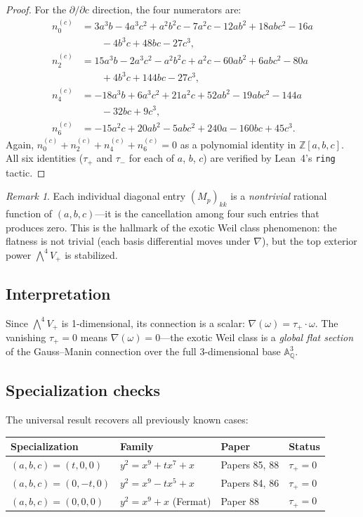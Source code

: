 \documentclass[11pt,a4paper]{article}
\theoremstyle{definition}
\theoremstyle{remark}
\newtheorem{remark}[theorem]{Remark}
\newcommand{\ZZ}{\mathbb{Z}}
\newcommand{\QQ}{\mathbb{Q}}
\newcommand{\Aff}{\mathbb{A}}
\begin{document}
\begin{proof}
For the $\partial/\partial c$ direction, the four numerators are:
\begin{align*}
  n_0^{(c)} &= 3a^3b - 4a^3c^2 + a^2b^2c - 7a^2c - 12ab^2 + 18abc^2 - 16a \\
      &\qquad - 4b^3c + 48bc - 27c^3, \\
  n_2^{(c)} &= 15a^3b - 2a^3c^2 - a^2b^2c + a^2c - 60ab^2 + 6abc^2 - 80a \\
      &\qquad + 4b^3c + 144bc - 27c^3, \\
  n_4^{(c)} &= -18a^3b + 6a^3c^2 + 21a^2c + 52ab^2 - 19abc^2 - 144a \\
      &\qquad - 32bc + 9c^3, \\
  n_6^{(c)} &= -15a^2c + 20ab^2 - 5abc^2 + 240a - 160bc + 45c^3.
\end{align*}
Again, $n_0^{(c)} + n_2^{(c)} + n_4^{(c)} + n_6^{(c)} = 0$ as a polynomial
identity in $\ZZ[a,b,c]$.
All six identities ($\tau_+$ and $\tau_-$ for each of $a$, $b$, $c$)
are verified by Lean~4's \texttt{ring} tactic.
\end{proof}

\begin{remark}
Each individual diagonal entry $(M_p)_{kk}$ is a \emph{nontrivial}
rational function of $(a,b,c)$---it is the cancellation among four
such entries that produces zero.
This is the hallmark of the exotic Weil class phenomenon: the flatness
is not trivial (each basis differential moves under $\nabla$), but the
top exterior power $\bigwedge^4 V_+$ is stabilized.
\end{remark}

\subsection{Interpretation}

Since $\bigwedge^4 V_+$ is 1-dimensional, its connection is a scalar:
$\nabla(\omega) = \tau_+ \cdot \omega$.
The vanishing $\tau_+ = 0$ means $\nabla(\omega) = 0$---the exotic Weil
class is a \emph{global flat section} of the Gauss--Manin connection
over the full 3-dimensional base $\Aff^3_\QQ$.

\subsection{Specialization checks}

The universal result recovers all previously known cases:
\begin{center}
\begin{tabular}{@{}llll@{}}
\toprule
\textbf{Specialization} & \textbf{Family} & \textbf{Paper} & \textbf{Status} \\
\midrule
$(a,b,c) = (t,0,0)$ & $y^2 = x^9 + tx^7 + x$ & Papers 85, 88 & $\tau_+ = 0$ \\
$(a,b,c) = (0,-t,0)$ & $y^2 = x^9 - tx^5 + x$ & Papers 84, 86 & $\tau_+ = 0$ \\
$(a,b,c) = (0,0,0)$ & $y^2 = x^9 + x$ (Fermat) & Paper 88 & $\tau_+ = 0$ \\
\bottomrule
\end{tabular}
\end{center}
\end{document}

